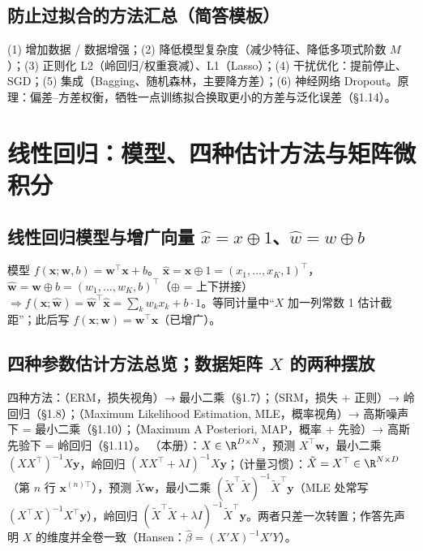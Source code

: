 \subsection{防止过拟合的方法汇总（简答模板）}
(1) 增加数据 / 数据增强；(2) 降低模型复杂度（减少特征、降低多项式阶数 $M$）；(3) 正则化 L2（岭回归/权重衰减）、L1（Lasso）；(4) 干扰优化：提前停止、SGD；(5) 集成（Bagging、随机森林，主要降方差）；(6) 神经网络 Dropout。原理：偏差–方差权衡，牺牲一点训练拟合换取更小的方差与泛化误差（§1.14）。

\section{线性回归：模型、四种估计方法与矩阵微积分}

\subsection{线性回归模型与增广向量 \texorpdfstring{$\hat x=x\oplus1$}{x-hat}、\texorpdfstring{$\hat w=w\oplus b$}{w-hat}}
模型 $f(\bm x;\bm w,b)=\bm w^\top\bm x+b$。 $\hat{\bm x}=\bm x\oplus1=(x_1,\dots,x_K,1)^\top$， $\hat{\bm w}=\bm w\oplus b=(w_1,\dots,w_K,b)^\top$（$\oplus$ = 上下拼接）$\Rightarrow f(\bm x;\hat{\bm w})=\hat{\bm w}^\top\hat{\bm x}=\sum_kw_kx_k+b\cdot1$。等同计量中“$X$ 加一列常数 1 估计截距”；此后写 $f(\bm x;\bm w)=\bm w^\top\bm x$（已增广）。

\subsection{四种参数估计方法总览；数据矩阵 \texorpdfstring{$X$}{X} 的两种摆放}
四种方法：（ERM，损失视角）→ 最小二乘（§1.7）；（SRM，损失 + 正则）→ 岭回归（§1.8）；（Maximum Likelihood Estimation, MLE，概率视角）→ 高斯噪声下 = 最小二乘（§1.10）；（Maximum A Posteriori, MAP，概率 + 先验）→ 高斯先验下 = 岭回归（§1.11）。
（本册）：$X\in\R^{D\times N}$，预测 $X^\top\bm w$，最小二乘 $(XX^\top)^{-1}X\bm y$，岭回归 $(XX^\top+\lambda I)^{-1}X\bm y$；（计量习惯）：$\tilde X=X^\top\in\R^{N\times D}$（第 $n$ 行 $\bm x^{(n)\top}$），预测 $\tilde X\bm w$，最小二乘 $(\tilde X^\top\tilde X)^{-1}\tilde X^\top\bm y$（MLE 处常写 $(X^\top X)^{-1}X^\top\bm y$），岭回归 $(\tilde X^\top\tilde X+\lambda I)^{-1}\tilde X^\top\bm y$。两者只差一次转置；作答先声明 $X$ 的维度并全卷一致（Hansen：$\hat\beta=(X'X)^{-1}X'Y$）。

